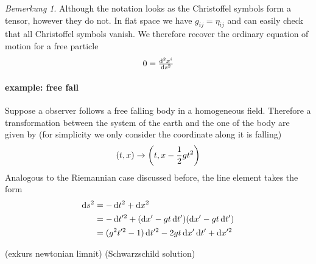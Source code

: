 \documentclass[
    a4paper,                                               %
    oneside,                                               %
    12pt,                                                  %
    headsepline,                                           %
    xcolor=dvipsnames
    ]{scrreprt}
\theoremstyle{definition}
\theoremstyle{remark}
\newtheorem{bemerkung}{Bemerkung}
\let\originalleft\left
\let\originalright\right
\renewcommand{\left}{\mathopen{}\mathclose\bgroup\originalleft}
\renewcommand{\right}{\aftergroup\egroup\originalright}
\begin{document}
\begin{bemerkung}
	Although the notation looks as the Christoffel symbols form a tensor, however they do not. In flat space we have $g_{ij}=\eta_{ij}$ and can easily check that all Christoffel symbols vanish. We therefore recover the ordinary equation of motion for a free particle
	\begin{equation}
			0 = \od[2]{x^i}{s}
	\end{equation}
	\paragraph{example: free fall}
	Suppose a observer follows a free falling body in a homogeneous field. Therefore a transformation between the system of the earth and the one of the body are given by (for simplicity we only consider the coordinate along it is falling)
	\begin{equation}
		(t,x)\to\left(t,x-\frac{1}{2}gt^2\right)
	\end{equation}
	Analogous to the Riemannian case discussed before, the line element takes the form
	\begin{align*}
		\dif s^2&=-\dif t^2 +\dif x^2\\
			&=-\dif t'^2+(\dif x'- gt\dif t')(\dif x'- gt\dif t')\\
			&=(g^2t'^2-1)\dif t'^2-2gt\dif x'\dif t'+\dif x'^2\\
	\end{align*}
\end{bemerkung}
	(exkurs newtonian limnit)
	(Schwarzschild solution)
\end{document}
